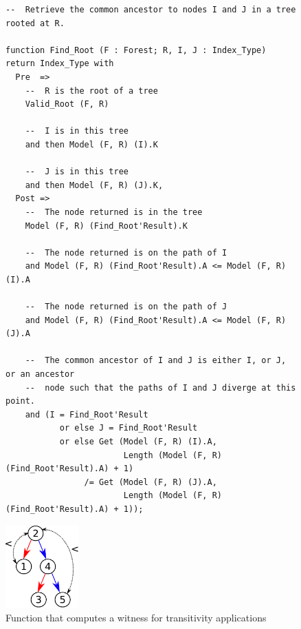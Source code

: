 \documentclass{llncs}
\begin{document}
\begin{figure}
\begin{minipage}[c]{\linewidth}
\begin{small}
\begin{lstlisting}
--  Retrieve the common ancestor to nodes I and J in a tree rooted at R.

function Find_Root (F : Forest; R, I, J : Index_Type) return Index_Type with
  Pre  =>
    --  R is the root of a tree
    Valid_Root (F, R)

    --  I is in this tree
    and then Model (F, R) (I).K

    --  J is in this tree
    and then Model (F, R) (J).K,
  Post =>
    --  The node returned is in the tree
    Model (F, R) (Find_Root'Result).K

    --  The node returned is on the path of I
    and Model (F, R) (Find_Root'Result).A <= Model (F, R) (I).A

    --  The node returned is on the path of J
    and Model (F, R) (Find_Root'Result).A <= Model (F, R) (J).A

    --  The common ancestor of I and J is either I, or J, or an ancestor
    --  node such that the paths of I and J diverge at this point.
    and (I = Find_Root'Result
           or else J = Find_Root'Result
           or else Get (Model (F, R) (I).A,
                        Length (Model (F, R) (Find_Root'Result).A) + 1)
                /= Get (Model (F, R) (J).A,
                        Length (Model (F, R) (Find_Root'Result).A) + 1));
\end{lstlisting}
\end{small}
\end{minipage}\hspace*{-30mm}
\begin{minipage}[c]{.22\linewidth}
\begin{center}
\vspace*{-35mm}
\includegraphics[width=28mm]{transitivity.pdf}
\end{center}
\end{minipage}
\caption{\label{fig-proof-wit} Function that computes a witness for transitivity applications}
\end{figure}
\end{document}
